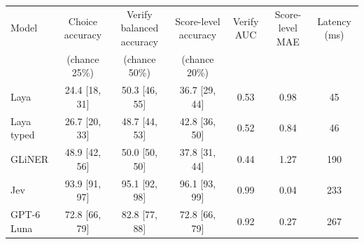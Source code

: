 \begin{tabular}{lcccccc}
\toprule
Model & Choice accuracy & Verify balanced accuracy & Score-level accuracy & Verify AUC & Score-level MAE & Latency (ms) \\
 & (chance 25\%) & (chance 50\%) & (chance 20\%) &  &  & \\
\midrule
Laya & 24.4 [18, 31] & 50.3 [46, 55] & 36.7 [29, 44] & 0.53 & 0.98 & 45 \\
Laya typed & 26.7 [20, 33] & 48.7 [44, 53] & 42.8 [36, 50] & 0.52 & 0.84 & 46 \\
GLiNER & 48.9 [42, 56] & 50.0 [50, 50] & 37.8 [31, 44] & 0.44 & 1.27 & 190 \\
Jev & 93.9 [91, 97] & 95.1 [92, 98] & 96.1 [93, 99] & 0.99 & 0.04 & 233 \\
GPT-6 Luna & 72.8 [66, 79] & 82.8 [77, 88] & 72.8 [66, 79] & 0.92 & 0.27 & 267 \\
\bottomrule
\end{tabular}
